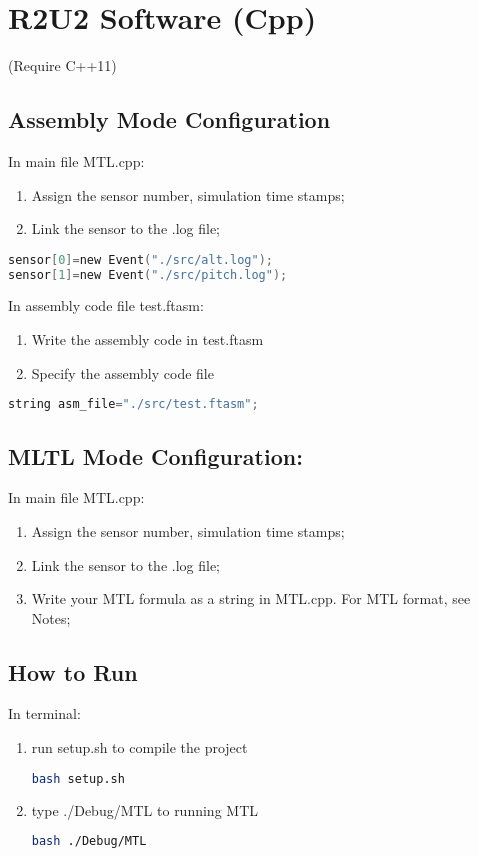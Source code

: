\section{R2U2 Software (Cpp)}
(Require C++11)

\subsection{Assembly Mode Configuration}
In main file MTL.cpp:
\begin{enumerate}
\item  Assign the sensor number, simulation time stamps;
\item  Link the sensor to the .log file;
\end{enumerate}
\begin{lstlisting}[language=C]
sensor[0]=new Event("./src/alt.log");
sensor[1]=new Event("./src/pitch.log");
\end{lstlisting}

In assembly code file test.ftasm:
\begin{enumerate}
\item Write the assembly code in test.ftasm
\item Specify the assembly code file
\end{enumerate}
\begin{lstlisting}[language=C]
string asm_file="./src/test.ftasm";
\end{lstlisting}

\subsection{MLTL Mode Configuration:}
In main file MTL.cpp:
\begin{enumerate}
\item Assign the sensor number, simulation time stamps;
\item Link the sensor to the .log file;
\item Write your MTL formula as a string in MTL.cpp. For MTL format, see Notes;
\end{enumerate}


\subsection{How to Run}
In terminal:
\begin{enumerate}
\item run setup.sh to compile the project
\begin{lstlisting}[language=Bash]
bash setup.sh
\end{lstlisting}
\item type ./Debug/MTL to running MTL
\begin{lstlisting}[language=Bash]
bash ./Debug/MTL
\end{lstlisting}
\end{enumerate}

